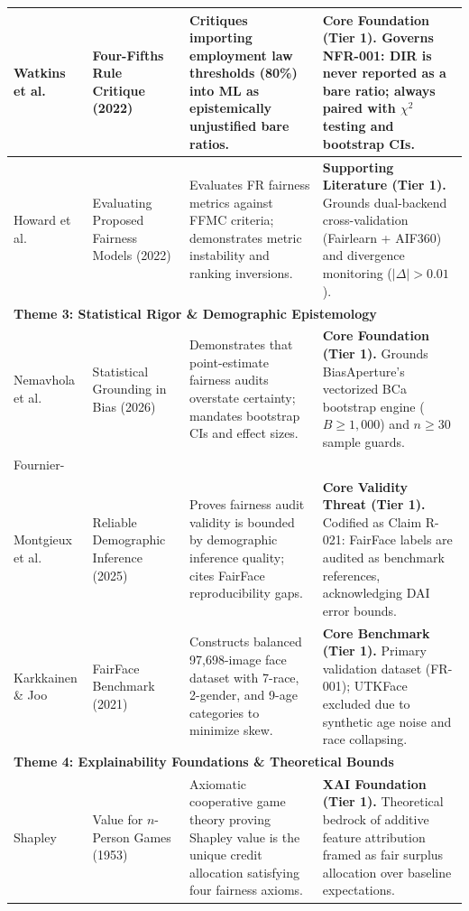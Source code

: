 \begin{center}
\begin{longtable}{|p{2.2cm}|p{2.6cm}|p{4.4cm}|p{4.4cm}|}
Watkins et al. \cite{watkins2022fourfifths} &
Four-Fifths Rule Critique (2022) &
Critiques importing employment law thresholds (80\%) into ML as epistemically unjustified bare ratios. &
\textbf{Core Foundation (Tier 1).} Governs NFR-001: DIR is never reported as a bare ratio; always paired with $\chi^2$ testing and bootstrap CIs. \\
\hline

Howard et al. \cite{howard2022evaluating} &
Evaluating Proposed Fairness Models (2022) &
Evaluates FR fairness metrics against FFMC criteria; demonstrates metric instability and ranking inversions. &
\textbf{Supporting Literature (Tier 1).} Grounds dual-backend cross-validation (Fairlearn + AIF360) and divergence monitoring ($|\Delta| > 0.01$). \\
\hline

\multicolumn{4}{|l|}{\textbf{Theme 3: Statistical Rigor \& Demographic Epistemology}} \\
\hline
Nemavhola et al. \cite{nemavhola2026reassessing} &
Statistical Grounding in Bias (2026) &
Demonstrates that point-estimate fairness audits overstate certainty; mandates bootstrap CIs and effect sizes. &
\textbf{Core Foundation (Tier 1).} Grounds BiasAperture's vectorized BCa bootstrap engine ($B \ge 1,000$) and $n \ge 30$ sample guards. \\
\hline

Fournier-\\Montgieux et al. \cite{fourniermontgieux2025reliable} &
Reliable Demographic Inference (2025) &
Proves fairness audit validity is bounded by demographic inference quality; cites FairFace reproducibility gaps. &
\textbf{Core Validity Threat (Tier 1).} Codified as Claim R-021: FairFace labels are audited as benchmark references, acknowledging DAI error bounds. \\
\hline

Karkkainen \& Joo \cite{karkkainen2021fairface} &
FairFace Benchmark (2021) &
Constructs balanced 97,698-image face dataset with 7-race, 2-gender, and 9-age categories to minimize skew. &
\textbf{Core Benchmark (Tier 1).} Primary validation dataset (FR-001); UTKFace excluded due to synthetic age noise and race collapsing. \\
\hline

\multicolumn{4}{|l|}{\textbf{Theme 4: Explainability Foundations \& Theoretical Bounds}} \\
\hline
Shapley \cite{shapley1953value} &
Value for $n$-Person Games (1953) &
Axiomatic cooperative game theory proving Shapley value is the unique credit allocation satisfying four fairness axioms. &
\textbf{XAI Foundation (Tier 1).} Theoretical bedrock of additive feature attribution framed as fair surplus allocation over baseline expectations. \\
\hline


\end{longtable}
\end{center}
